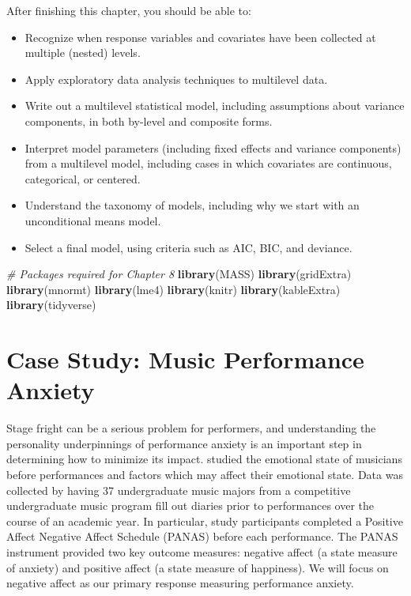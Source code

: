 \documentclass[
]{krantz}
\newenvironment{Shaded}{\begin{snugshade}}{\end{snugshade}}
\newcommand{\CommentTok}[1]{\textcolor[rgb]{0.37,0.37,0.37}{\textit{#1}}}
\newcommand{\FunctionTok}[1]{\textcolor[rgb]{0.27,0.27,0.27}{\textbf{#1}}}
\newcommand{\NormalTok}[1]{#1}
\providecommand{\tightlist}{%
  \setlength{\itemsep}{0pt}\setlength{\parskip}{0pt}}
\begin{document}
After finishing this chapter, you should be able to:

\begin{itemize}
\tightlist
\item
  Recognize when response variables and covariates have been collected at multiple (nested) levels.
\item
  Apply exploratory data analysis techniques to multilevel data.
\item
  Write out a multilevel statistical model, including assumptions about variance components, in both by-level and composite forms.
\item
  Interpret model parameters (including fixed effects and variance components) from a multilevel model, including cases in which covariates are continuous, categorical, or centered.
\item
  Understand the taxonomy of models, including why we start with an unconditional means model.
\item
  Select a final model, using criteria such as AIC, BIC, and deviance.
\end{itemize}

\begin{Shaded}
\begin{Highlighting}[]
\CommentTok{\# Packages required for Chapter 8}
\FunctionTok{library}\NormalTok{(MASS)}
\FunctionTok{library}\NormalTok{(gridExtra)  }
\FunctionTok{library}\NormalTok{(mnormt) }
\FunctionTok{library}\NormalTok{(lme4) }
\FunctionTok{library}\NormalTok{(knitr) }
\FunctionTok{library}\NormalTok{(kableExtra)}
\FunctionTok{library}\NormalTok{(tidyverse)}
\end{Highlighting}
\end{Shaded}

\section{Case Study: Music Performance Anxiety}\label{cs:music}

Stage fright can be a serious problem for performers, and understanding the personality underpinnings of performance anxiety is an important step in determining how to minimize its impact. \citet{Miller2010} studied the emotional state of musicians before performances and factors which may affect their emotional state. Data was collected by having 37 undergraduate music majors from a competitive undergraduate music program fill out diaries prior to performances over the course of an academic year. In particular, study participants completed a Positive Affect Negative Affect Schedule (PANAS) before each performance. The PANAS instrument provided two key outcome measures: negative affect (a state measure of anxiety) and positive affect (a state measure of happiness). We will focus on negative affect as our primary response measuring performance anxiety.
\end{document}
